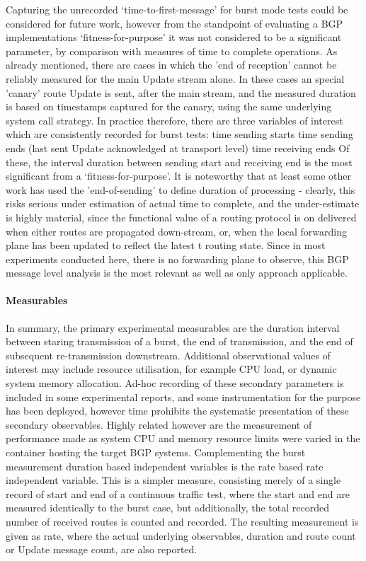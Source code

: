Capturing the unrecorded `time-to-first-message' for burst mode tests could be considered for future work, however from the standpoint of evaluating a BGP implementations `fitness-for-purpose' it was not considered to be a significant parameter, by comparison with measures of time to complete operations.
As already mentioned, there are cases in which the 'end of reception' cannot be reliably measured for the main Update stream alone.
In these cases an special 'canary' route Update is sent, after the main stream, and the measured duration is based on timestamps captured for the canary, using the same underlying system call strategy.
In practice therefore, there are three variables of interest which are consistently recorded for burst tests: time sending starts time sending ends (last sent Update acknowledged at transport level) time receiving ends Of these, the interval duration between sending start and receiving end is the most significant from a `fitness-for-purpose'.
It is noteworthy that at least some other work has used the 'end-of-sending' to define duration of processing - clearly, this risks serious under estimation of actual time to complete, and the under-estimate is highly material, since the functional value of a routing protocol is on delivered when either routes are propagated down-stream, or, when the local forwarding plane has been updated to reflect the latest t routing state.
Since in most experiments conducted here, there is no forwarding plane to observe, this BGP message level analysis is the most relevant as well as only approach applicable.

\paragraph{Measurables}
In summary, the primary experimental measurables are the duration interval between staring transmission of a burst, the end of transmission, and the end of subsequent re-transmission downstream.
Additional observational values of interest may include resource utilisation, for example CPU load, or dynamic system memory allocation.
Ad-hoc recording of these secondary parameters is included in some experimental reports, and some instrumentation for the purpose has been deployed, however time prohibits the systematic presentation of these secondary observables.
Highly related however are the measurement of performance made as system CPU and memory resource limits were varied in the container hosting the target BGP systems.
Complementing the burst measurement duration based independent variables is the rate based rate independent variable.
This is a simpler measure, consisting merely of a single record of start and end of a continuous traffic test, where the start and end are measured identically to the burst case, but additionally, the total recorded number of received routes is counted and recorded.
The resulting measurement is given as rate, where the actual underlying observables, duration and route count or Update message count, are also reported.


